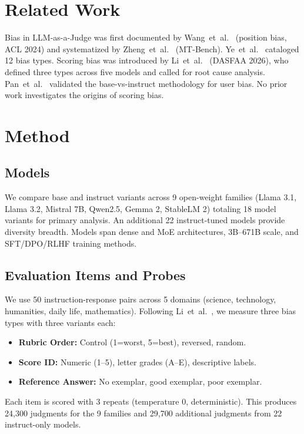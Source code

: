 \documentclass[11pt,a4paper]{article}
\begin{document}
\section{Related Work}

Bias in LLM-as-a-Judge was first documented by Wang~et~al.~\cite{wang2023large} (position bias, ACL 2024) and systematized by Zheng~et~al.~\cite{zheng2023judging} (MT-Bench). Ye~et~al.~\cite{ye2024justice} cataloged 12 bias types. Scoring bias was introduced by Li~et~al.~\cite{li2025scoring} (DASFAA 2026), who defined three types across five models and called for root cause analysis. Pan~et~al.~\cite{pan2025user} validated the base-vs-instruct methodology for user bias. No prior work investigates the origins of scoring bias.

\section{Method}

\subsection{Models}
We compare base and instruct variants across 9 open-weight families (Llama 3.1, Llama 3.2, Mistral 7B, Qwen2.5, Gemma 2, StableLM 2) totaling 18 model variants for primary analysis. An additional 22 instruct-tuned models provide diversity breadth. Models span dense and MoE architectures, 3B--671B scale, and SFT/DPO/RLHF training methods.

\subsection{Evaluation Items and Probes}
We use 50 instruction-response pairs across 5 domains (science, technology, humanities, daily life, mathematics). Following Li~et~al.~\cite{li2025scoring}, we measure three bias types with three variants each:
\begin{itemize}
    \item \textbf{Rubric Order:} Control (1=worst, 5=best), reversed, random.
    \item \textbf{Score ID:} Numeric (1--5), letter grades (A--E), descriptive labels.
    \item \textbf{Reference Answer:} No exemplar, good exemplar, poor exemplar.
\end{itemize}
Each item is scored with 3 repeats (temperature 0, deterministic). This produces 24,300 judgments for the 9 families and 29,700 additional judgments from 22 instruct-only models.
\end{document}
